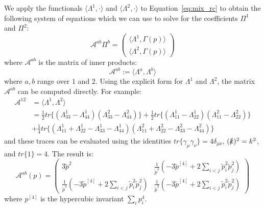 \documentclass[11pt, oneside]{article}   	%
\theoremstyle{definition}
\begin{document}
We apply the functionals $\langle\Lambda^1, \cdot\rangle$ and $\langle\Lambda^2, \cdot\rangle$ to 
Equation~\ref{eq:mix_rc} to obtain the following system of equations which we can use to solve for the 
coefficients $\Pi^1$ and $\Pi^2$:
\begin{equation}
	\mathcal A^{ab}\Pi^b = \begin{pmatrix} \langle \Lambda^1, \Gamma(p) \rangle \\ \langle \Lambda^2, \Gamma(p) \rangle \end{pmatrix}
\end{equation}
where $\mathcal A^{ab}$ is the matrix of inner products:
\begin{equation}
	\mathcal A^{ab} := \langle \Lambda^a, \Lambda^b\rangle
\end{equation}
where $a, b$ range over $1$ and $2$. Using the explicit form for $\Lambda^1$ and $\Lambda^2$, the matrix $\mathcal A^{ab}$ can be computed 
directly. For example:
\begin{align}
	\mathcal A^{12} &= \langle\Lambda^1, \Lambda^2\rangle \\
	&= \frac{1}{2}tr\bigg\{(\Lambda^1_{33} - \Lambda^1_{44}) (\Lambda^2_{33} - \Lambda^2_{44})\bigg\} + \frac{1}{2}tr\bigg\{(\Lambda^1_{11} - \Lambda^1_{22}) 
	(\Lambda^2_{11} - \Lambda^2_{22})\bigg\} \\
	&+  \frac{1}{4}tr\bigg\{(\Lambda^1_{11} + \Lambda^1_{22} - \Lambda^1_{33} - \Lambda^1_{44}) (\Lambda^2_{11} + \Lambda^2_{22} - \Lambda^2_{33} - 
	\Lambda^2_{44})\bigg\}
\end{align}
and these traces can be evaluated using the identities $tr\{\gamma_\mu\gamma_\nu\} = 4\delta_{\mu\nu}$, $(\slashed k)^2 = k^2$, and $tr\{1\} = 4$. The 
result is:
\begin{equation}
	\mathcal A^{ab}(p) = \begin{pmatrix} 3\tilde p^2 & \frac{1}{\tilde p^2} \left( -3 \tilde p^{[4]} + 2 \sum_{i < j} \tilde p_i^2 \tilde p_j^2\right) \\ \frac{1}{\tilde p^2} 
	\left( -3 \tilde p^{[4]} + 2 \sum_{i < j} \tilde p_i^2 \tilde p_j^2\right) & \frac{1}{\tilde p^2} \left( -3 \tilde p^{[4]} + 2 \sum_{i < j} \tilde p_i^2 \tilde p_j^2\right) \end{pmatrix}
\end{equation}
where $p^{[4]}$ is the hypercubic invariant $\sum_i p_i^4$. 

\end{document}
